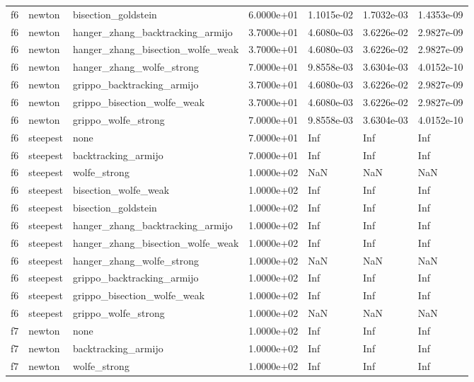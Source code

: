 \documentclass[a4paper,11pt]{article}
\numberwithin{equation}{section} %
\begin{document}
\begin{longtable}{p{1.5cm}|p{1.5cm}|p{4cm}|p{2cm}|p{2cm}|p{2cm}|p{2cm}}
        f6 & newton & bisection\_goldstein & 6.0000e+01 & 1.1015e-02 & 1.7032e-03 & 1.4353e-09 \\
        f6 & newton & hanger\_zhang\_backtracking\_armijo & 3.7000e+01 & 4.6080e-03 & 3.6226e-02 & 2.9827e-09 \\
        f6 & newton & hanger\_zhang\_bisection\_wolfe\_weak & 3.7000e+01 & 4.6080e-03 & 3.6226e-02 & 2.9827e-09 \\
        f6 & newton & hanger\_zhang\_wolfe\_strong & 7.0000e+01 & 9.8558e-03 & 3.6304e-03 & 4.0152e-10 \\
        f6 & newton & grippo\_backtracking\_armijo & 3.7000e+01 & 4.6080e-03 & 3.6226e-02 & 2.9827e-09 \\
        f6 & newton & grippo\_bisection\_wolfe\_weak & 3.7000e+01 & 4.6080e-03 & 3.6226e-02 & 2.9827e-09 \\
        f6 & newton & grippo\_wolfe\_strong & 7.0000e+01 & 9.8558e-03 & 3.6304e-03 & 4.0152e-10 \\
        f6 & steepest & none & 7.0000e+01 & Inf & Inf & Inf \\
        f6 & steepest & backtracking\_armijo & 7.0000e+01 & Inf & Inf & Inf \\
        f6 & steepest & wolfe\_strong & 1.0000e+02 & NaN & NaN & NaN \\
        f6 & steepest & bisection\_wolfe\_weak & 1.0000e+02 & Inf & Inf & Inf \\
        f6 & steepest & bisection\_goldstein & 1.0000e+02 & Inf & Inf & Inf \\
        f6 & steepest & hanger\_zhang\_backtracking\_armijo & 1.0000e+02 & Inf & Inf & Inf \\
        f6 & steepest & hanger\_zhang\_bisection\_wolfe\_weak & 1.0000e+02 & Inf & Inf & Inf \\
        f6 & steepest & hanger\_zhang\_wolfe\_strong & 1.0000e+02 & NaN & NaN & NaN \\
        f6 & steepest & grippo\_backtracking\_armijo & 1.0000e+02 & Inf & Inf & Inf \\
        f6 & steepest & grippo\_bisection\_wolfe\_weak & 1.0000e+02 & Inf & Inf & Inf \\
        f6 & steepest & grippo\_wolfe\_strong & 1.0000e+02 & NaN & NaN & NaN \\
        f7 & newton & none & 1.0000e+02 & Inf & Inf & Inf \\
        f7 & newton & backtracking\_armijo & 1.0000e+02 & Inf & Inf & Inf \\
        f7 & newton & wolfe\_strong & 1.0000e+02 & Inf & Inf & Inf \\

\end{longtable}
\end{document}
